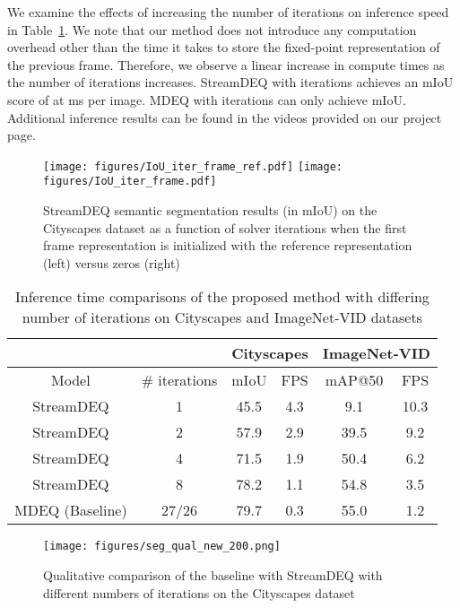 \documentclass[runningheads]{llncs}
\begin{document}
We examine the effects of increasing the number of iterations on inference speed in Table~\ref{tab:inference_speed}. We note that our method does not introduce any computation overhead other than the time it takes to store the fixed-point representation of the previous frame. Therefore, we observe a linear increase in compute times as the number of iterations increases. StreamDEQ with  iterations achieves an mIoU score of  at  ms per image. MDEQ with  iterations can only achieve  mIoU. Additional inference results can be found in the videos provided on our project page.


\begin{figure}[t]
    \centering
    \texttt{[image: figures/IoU\_iter\_frame\_ref.pdf]}
    \hfill
    \texttt{[image: figures/IoU\_iter\_frame.pdf]} 
\caption{StreamDEQ semantic segmentation results (in mIoU) on the Cityscapes dataset as a function of solver iterations when the first frame representation is initialized with the reference representation (left) versus zeros (right)}
\label{fig:seg_f_iou_iter}
\end{figure}


\setlength{\tabcolsep}{4pt}
\begin{table}[t]
\begin{center}
\caption{Inference time comparisons of the proposed method with differing number of iterations on Cityscapes and ImageNet-VID datasets}
\label{tab:inference_speed}
\begin{tabular}{cccccc}
\hline\noalign{\smallskip}
 & & \multicolumn{2}{c}{Cityscapes} & \multicolumn{2}{c}{ImageNet-VID} \\
\hline\noalign{\smallskip}
Model & \# iterations & mIoU & FPS & mAP@50 & FPS \\
\noalign{\smallskip}
\hline
\noalign{\smallskip}
StreamDEQ & 1 & 45.5 & 4.3 & 9.1 & 10.3 \\
StreamDEQ & 2 & 57.9 & 2.9 & 39.5 & 9.2 \\
StreamDEQ & 4 & 71.5 & 1.9 & 50.4 & 6.2 \\
StreamDEQ & 8 & 78.2 & 1.1 & 54.8 & 3.5 \\
MDEQ (Baseline) & 27/26 & 79.7 & 0.3 & 55.0 & 1.2 \\
\hline
\end{tabular}
\end{center}
\end{table}
\setlength{\tabcolsep}{1.4pt}


\begin{figure}[t]
\centering
\texttt{[image: figures/seg\_qual\_new\_200.png]}
\caption{Qualitative comparison of the baseline with StreamDEQ with different numbers of iterations on the Cityscapes dataset}
\label{fig:seg_qual}
\end{figure}
\end{document}
